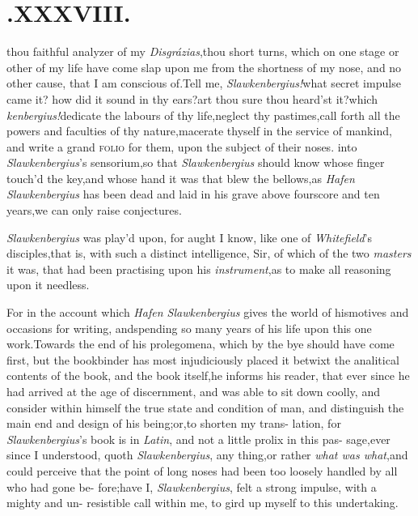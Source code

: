 \documentclass{article}
\begin{document}
\section{.\quad  XXXVIII.}

\@ thou faithful
analyzer of my \textit{Disgrázias},\tsk thou 
short turns, which on one stage
or other of my life have come slap upon me from the
shortness of my nose, and no other cause, that I am
conscious of.\tsk Tell me, \textit{Slawkenbergius!}\@ what
secret impulse 
came it? how did it sound in thy ears?\tsk art thou sure thou
heard’st it?\tsk which 
\break\textit{kenbergius!}\@ dedicate the labours of thy
life,\tsk neglect thy pastimes,\tsk call forth all the
powers and faculties of thy nature,\break\tsh macerate thyself in
the service of mankind, and write a grand \textsc{folio} for
them, upon the subject of their noses.\hfill{}
into \textit{Slawkenbergius}’s sensorium,\tsk so that
\textit{Slawkenbergius} should know whose finger touch’d the
key,\tsh and whose hand it was that blew the bellows,\tsh as
\textit{Hafen Slawkenbergius} has been dead and laid in his
grave above fourscore and ten years,\tsh we can only raise
conjectures.

\textit{Slawkenbergius} was play’d upon, for aught I know,
like one of \textit{Whitefield}’s disciples,\tsk that
is, with such a distinct\break
intelligence, Sir, of which of the two
\textit{masters} it was, that had been practising upon his
\textit{instrument},\tsh as to make all reasoning upon it
needless.

\tsh For in the account which \textit{Hafen Slawkenbergius}
gives the world of his\break motives and occasions for
writing, and\break spending so many years of his life
upon this one work.\tsk Towards the end of his
prolegomena, which by the bye should have come first,\tsh
but the bookbinder has most injudiciously placed it betwixt
the analitical contents of the book, and the book
itself,\tsk he informs his reader, that ever since he had
arrived at the age of discernment, and was able to sit down
coolly, and consider within himself the true state and
condition of man, and distinguish the main end and design of
his being;\tsk or,\tsk to shorten my trans-\break
lation, for \textit{Slawkenbergius}’s book is in\break
\textit{Latin}, and not a little prolix in this pas-\break
sage,\tsk ever since I understood, quoth\break
\textit{Slawkenbergius}, any thing,\tsk or rather\break
\textit{what was what},\tsk and could perceive\break
that the point of long noses had been too\break
loosely handled by all who had gone be-\break 
fore;\tsh have I, \textit{Slawkenbergius}, felt a\break
strong impulse, with a mighty and un- resistible call
within me, to gird up myself to this undertaking.
\end{document}
